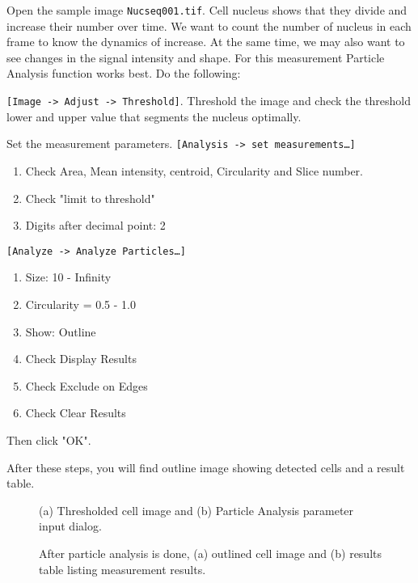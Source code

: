 \documentclass[11pt,a4paper,oneside]{report}
\newcommand{\ijmenu}[1]{\texttt{\small#1}}
\newcommand{\ilcom}[1]{\texttt{\small#1}}
\begin{document}
Open the sample image \ilcom{Nucseq001.tif}. Cell nucleus shows that they divide and 
increase their number over time. We want to count the number of nucleus in each frame to know 
the dynamics of increase. 
At the same time, we may also want to see changes in the signal intensity and shape. 
For this measurement Particle Analysis function works best. Do the following:

\begin{enumerate}
\small{
\item \ijmenu{[Image -> Adjust -> Threshold]}. 
Threshold the image and check the threshold lower and upper value that segments the nucleus optimally. 
\item Set the measurement parameters. \ijmenu{[Analysis -> set measurements\ldots]}
\begin{enumerate}
\item Check Area, Mean intensity, centroid, Circularity and Slice number. 
\item Check "limit to threshold"
\item Digits after decimal point: 2
\end{enumerate}
\item \ijmenu{[Analyze -> Analyze Particles\ldots]}
\begin{enumerate}
\item Size: 10 - Infinity
\item Circularity = 0.5 - 1.0
\item Show: Outline
\item Check Display Results
\item Check Exclude on Edges
\item Check Clear Results
\end{enumerate}
\item Then click "OK". 
}
\end{enumerate}
After these steps, you will find outline image showing detected cells and a result table. 

\begin{figure}[htbp]
 \centering
 \caption{ (a) Thresholded cell image and (b) Particle Analysis parameter input dialog.}
 \label{fig:ParticleAnalysis}
\end{figure}

\begin{figure}[htbp]
 \centering
 \caption{ After particle analysis is done, (a) outlined cell image and (b) results table listing measurement results.}
 \label{fig:ParticleAnalysisResults}
\end{figure}
\end{document}
